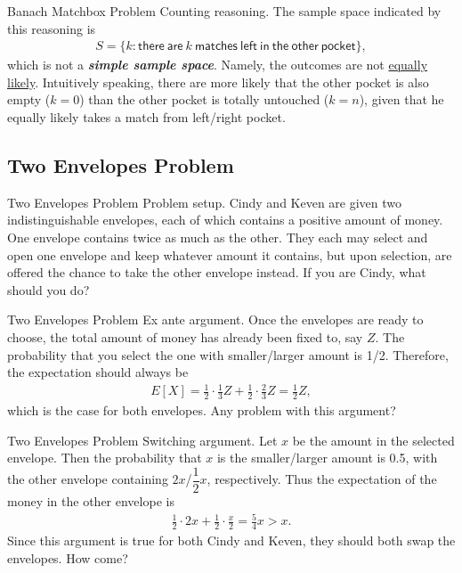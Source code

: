 \documentclass[hyperref={pdfpagelabels=false}]{beamer}
\newcommand{\highlightg}[1]{\textcolor[rgb]{0.1,0.5,0.3}{\emph{\textbf{#1}}}}
\newcommand{\structb}[1]{\textcolor[rgb]{0.2,0.2,0.7}{#1}}
\begin{document}
%
\begin{frame}{Banach Matchbox Problem}
    \justifying
    \structb{Counting reasoning.} The sample space indicated by this reasoning is 
    \begin{align*}
        S = \{k: \mathsf{there\ are\ } k \mathsf{\ matches\ left\ in\ the\ other\ pocket} \},
    \end{align*}
    which is not a \highlightg{simple sample space}. Namely, the outcomes are not \underline{equally likely}. Intuitively speaking, there are more likely that the other pocket is also empty ($k=0$) than the other pocket is totally untouched ($k=n$), given that he equally likely takes a match from left/right pocket.
\end{frame}
%
\subsection{Two Envelopes Problem}
%
\begin{frame}{Two Envelopes Problem}
    \justifying
    \structb{Problem setup.} Cindy and Keven are given two indistinguishable envelopes, each of which contains a positive amount of money. One envelope contains twice as much as the other. They each may select and open one envelope and keep whatever amount it contains, but upon selection, are offered the chance to take the other envelope instead. If you are Cindy, what should you do?
\end{frame}
%
\begin{frame}{Two Envelopes Problem}
    \justifying
    \structb{Ex ante argument.} Once the envelopes are ready to choose, the total amount of money has already been fixed to, say $Z$. The probability that you select the one with smaller/larger amount is 1/2. Therefore, the expectation should always be
    \begin{align*}
        E[X] = \frac{1}{2} \cdot \frac{1}{3}Z + \frac{1}{2} \cdot \frac{2}{3}Z = \frac{1}{2}Z,
    \end{align*}
    which is the case for both envelopes. Any problem with this argument?
\end{frame}
%
\begin{frame}{Two Envelopes Problem}
    \justifying
    \structb{Switching argument.} Let $x$ be the amount in the selected envelope. Then the probability that $x$ is the smaller/larger amount is 0.5, with the other envelope containing $2x$/$\dfrac{1}{2}x$, respectively. Thus the expectation of the money in the other envelope is
    \begin{align*}
        \frac{1}{2}\cdot 2x + \frac{1}{2} \cdot \frac{x}{2} = \frac{5}{4}x > x.
    \end{align*}
    Since this argument is true for both Cindy and Keven, they should both swap the envelopes. How come?
\end{frame}
\end{document}
